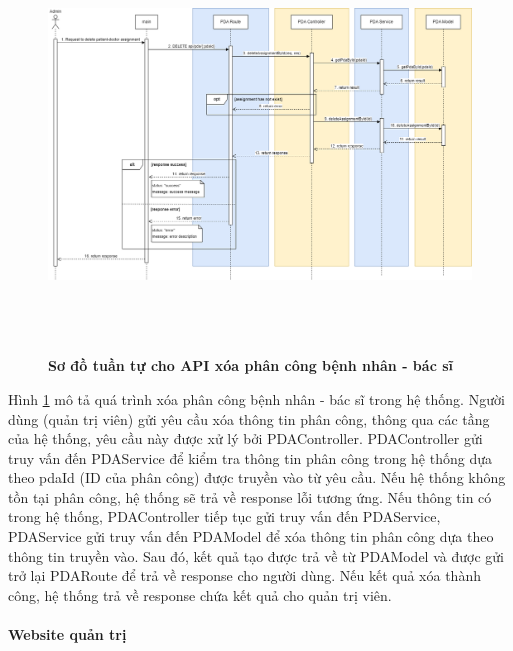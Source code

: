 \begin{figure}[H]
  \centering
  \includegraphics[width=16cm,height=11cm]{Images/sequence_api/deleteAssignment.png}
  \caption[Sơ đồ tuần tự cho API xóa phân công bệnh nhân - bác sĩ]{\bfseries \fontsize{12pt}{0pt}
  \selectfont Sơ đồ tuần tự cho API xóa phân công bệnh nhân - bác sĩ }
  \label{deletePDA} %
\end{figure}
Hình \ref{deletePDA} mô tả quá trình xóa phân công bệnh nhân - bác sĩ trong hệ thống. Người dùng (quản trị viên) gửi yêu cầu xóa thông tin phân công, thông qua các tầng của hệ thống, 
yêu cầu này được xử lý bởi PDAController. PDAController gửi truy vấn đến PDAService để kiểm tra thông tin phân công trong hệ thống dựa theo pdaId (ID của phân công) được truyền vào từ yêu cầu. 
Nếu hệ thống không tồn tại phân công, hệ thống sẽ trả về response lỗi tương ứng. Nếu thông tin có trong hệ thống, PDAController tiếp tục gửi truy vấn đến PDAService, PDAService gửi truy vấn đến PDAModel để xóa thông tin phân công 
dựa theo thông tin truyền vào. Sau đó, kết quả tạo được trả về từ PDAModel và được gửi trở lại PDARoute để trả về response cho người dùng. Nếu kết quả xóa thành công, hệ thống trả về response chứa kết quả cho quản trị viên. 

\paragraph{Website quản trị}
\mbox{}


